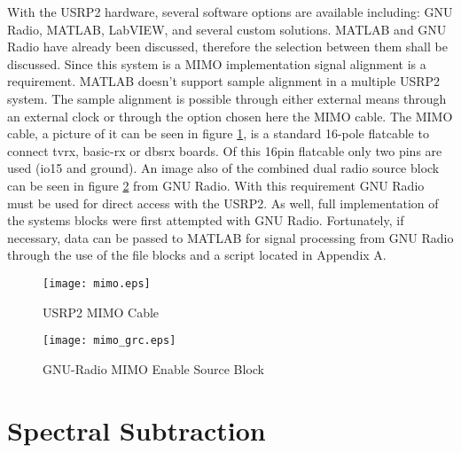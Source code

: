 With the USRP2 hardware, several software options are available including: GNU Radio, MATLAB, LabVIEW, and several custom solutions.  MATLAB and GNU Radio have already been discussed, therefore the selection between them shall be discussed.  Since this system is a MIMO implementation signal alignment is a requirement.  MATLAB doesn't support sample alignment in a multiple USRP2 system.  The sample alignment is possible through either external means through an external clock or through the option chosen here the MIMO cable.  The MIMO cable, a picture of it can be seen in figure \ref{mimo}, is a standard 16-pole flatcable to connect tvrx, basic-rx or dbsrx boards.  Of this 16pin flatcable only two pins are used (io15 and ground)\cite{mimo_cable}.  An image also of the combined dual radio source block can be seen in figure \ref{mimo_grc} from GNU Radio.  With this requirement GNU Radio must be used for direct access with the USRP2.  As well, full implementation of the systems blocks were first attempted with GNU Radio.  Fortunately, if necessary, data can be passed to MATLAB for signal processing from GNU Radio through the use of the file blocks and a script located in Appendix A.\\

\begin{figure}[!ht]\label{mimo}
\centering
\texttt{[image: mimo.eps]}%
\caption{USRP2 MIMO Cable}
\end{figure} 

\begin{figure}[!ht]\label{mimo_grc}
\centering
\texttt{[image: mimo\_grc.eps]}
\caption{GNU-Radio MIMO Enable Source Block}
\end{figure} 


\section{Spectral Subtraction}

